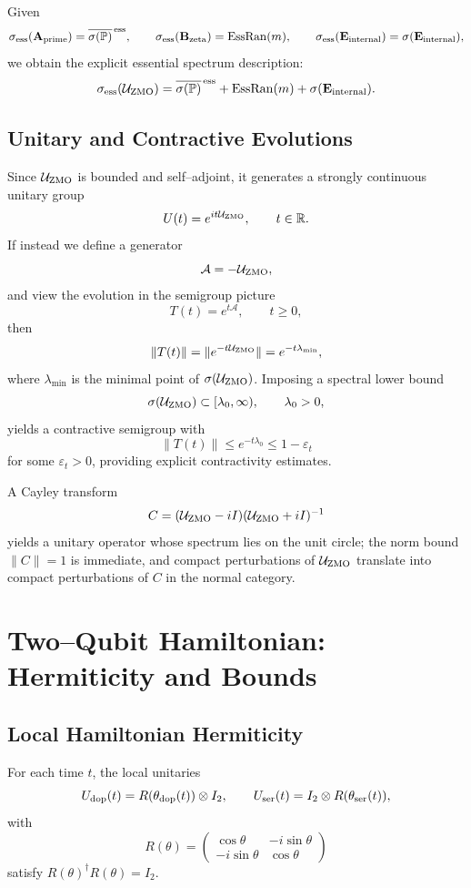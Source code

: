 \documentclass[11pt]{article}
\begin{document}
Given
\[
  \sigma_{\rm ess}(\mathbf{A}_{\rm prime})
  = \overline{\sigma(\mathbb{P})}^{\,\rm ess}, \qquad
  \sigma_{\rm ess}(\mathbf{B}_{\rm zeta}) = \operatorname{EssRan}(m), \qquad
  \sigma_{\rm ess}(\mathbf{E}_{\rm internal}) = \sigma(\mathbf{E}_{\rm internal}),
\]
we obtain the explicit essential spectrum description:
\[
  \sigma_{\rm ess}(\mathcal{U}_{\rm ZMO})
  = \overline{\sigma(\mathbb{P})}^{\,\rm ess}
    + \operatorname{EssRan}(m)
    + \sigma(\mathbf{E}_{\rm internal}).
\]

\subsection{Unitary and Contractive Evolutions}

Since \(\mathcal{U}_{\rm ZMO}\) is bounded and self–adjoint, it generates a strongly continuous unitary group
\[
  U(t) = e^{it\mathcal{U}_{\rm ZMO}}, \qquad t\in\mathbb{R}.
\]
If instead we define a generator
\[
  \mathcal{A} = -\mathcal{U}_{\rm ZMO},
\]
and view the evolution in the semigroup picture
\[
  T(t) = e^{t\mathcal{A}}, \qquad t\ge 0,
\]
then
\[
  \|T(t)\|
  = \|e^{-t\mathcal{U}_{\rm ZMO}}\|
  = e^{-t\lambda_{\min}},
\]
where \(\lambda_{\min}\) is the minimal point of \(\sigma(\mathcal{U}_{\rm ZMO})\). Imposing a spectral lower bound
\[
  \sigma(\mathcal{U}_{\rm ZMO}) \subset [\lambda_0,\infty), \qquad \lambda_0 > 0,
\]
yields a contractive semigroup with
\[
  \|T(t)\| \le e^{-t\lambda_0} \le 1 - \varepsilon_t
\]
for some \(\varepsilon_t>0\), providing explicit contractivity estimates.

A Cayley transform
\[
  C = (\mathcal{U}_{\rm ZMO}-iI)(\mathcal{U}_{\rm ZMO}+iI)^{-1}
\]
yields a unitary operator whose spectrum lies on the unit circle; the norm bound
\(\|C\|=1\) is immediate, and compact perturbations of \(\mathcal{U}_{\rm ZMO}\) translate into compact perturbations of \(C\) in the normal category.

\section{Two–Qubit Hamiltonian: Hermiticity and Bounds}

\subsection{Local Hamiltonian Hermiticity}

For each time \(t\), the local unitaries
\[
  U_{\rm dop}(t) = R(\theta_{\rm dop}(t))\otimes I_2, \qquad
  U_{\rm ser}(t) = I_2 \otimes R(\theta_{\rm ser}(t)),
\]
with
\[
  R(\theta) = \begin{pmatrix}
    \cos\theta & -i\sin\theta \\
    -i\sin\theta & \cos\theta
  \end{pmatrix}
\]
satisfy \(R(\theta)^\dagger R(\theta) = I_2\).
\end{document}
